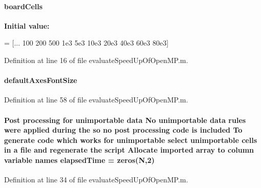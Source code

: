 \paragraph[{board\+Cells}]{\setlength{\rightskip}{0pt plus 5cm}board\+Cells}\label{a00100_a9a8e1837f52184441d209914b37780be}
{\bfseries Initial value\+:}
\begin{DoxyCode}
= [...
    100
    200
    500
    1e3
    5e3
    10e3
    20e3
    40e3
    60e3
    80e3]
\end{DoxyCode}


Definition at line 16 of file evaluate\+Speed\+Up\+Of\+Open\+M\+P.\+m.

\hypertarget{a00100_ade38533eb5b089781eff78d9eb5d1d3d}{}
\paragraph[{default\+Axes\+Font\+Size}]{\setlength{\rightskip}{0pt plus 5cm}default\+Axes\+Font\+Size}\label{a00100_ade38533eb5b089781eff78d9eb5d1d3d}


Definition at line 58 of file evaluate\+Speed\+Up\+Of\+Open\+M\+P.\+m.

\hypertarget{a00100_ab95225146f45d9e8e1089618cf68c6e1}{}
\paragraph[{elapsed\+Time}]{\setlength{\rightskip}{0pt plus 5cm}Post processing for unimportable {\bf data} No unimportable {\bf data} rules were applied during the so no post processing code is included To generate code which works for unimportable select unimportable cells in a {\bf file} and regenerate the script Allocate imported array to column variable names elapsed\+Time = zeros({\bf N},2)}\label{a00100_ab95225146f45d9e8e1089618cf68c6e1}


Definition at line 34 of file evaluate\+Speed\+Up\+Of\+Open\+M\+P.\+m.

\hypertarget{a00100_a77a507e5a0b77cdca2f380c2a67dda92}{}
